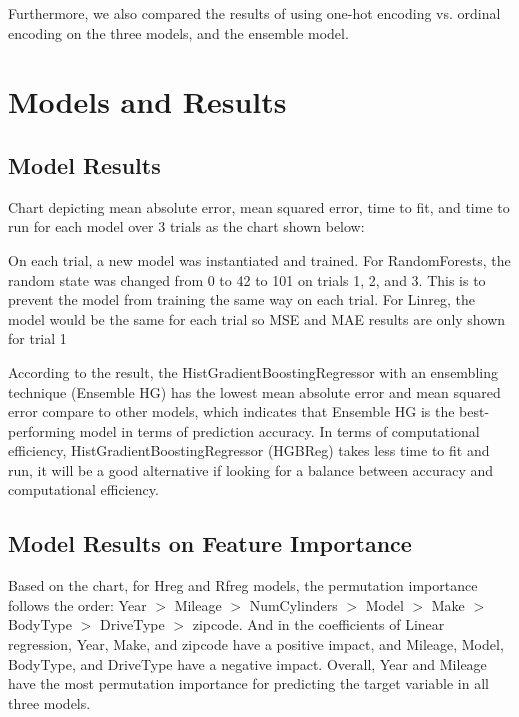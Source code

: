 \documentclass[UTF8]{ctexart}
\begin{document}
    Furthermore, we also compared the results of using one-hot encoding vs. ordinal encoding on the three models, and the ensemble model.
    \newline

    
    \section{Models and Results}
        \subsection{Model Results}
        Chart depicting mean absolute error, mean squared error, time to fit, and time to run for each model over 3 trials as the chart shown below:

        
        On each trial, a new model was instantiated and trained. For RandomForests, the random state was changed from 0 to 42 to 101 on trials 1, 2, and 3. This is to prevent the model from training the same way on each trial. For Linreg, the model would be the same for each trial so MSE and MAE results are only shown for trial 1
        
        According to the result, the HistGradientBoostingRegressor with an ensembling technique (Ensemble HG) has the lowest mean absolute error and mean squared error compare to other models, which indicates that Ensemble HG is the best-performing model in terms of prediction accuracy. In terms of computational efficiency, HistGradientBoostingRegressor (HGBReg) takes less time to fit and run, it will be a good alternative if looking for a balance between accuracy and computational efficiency.
        \newline
        \subsection{Model Results on Feature Importance}
    
         Based on the chart, for Hreg and Rfreg models, the permutation importance follows the order: Year $>$ Mileage $>$ NumCylinders $>$ Model $>$ Make $>$ BodyType $>$ DriveType $>$ zipcode. And in the coefficients of Linear regression, Year, Make, and zipcode have a positive impact, and Mileage, Model, BodyType, and DriveType have a negative impact. Overall, Year and Mileage have the most permutation importance for predicting the target variable in all three models. \newline
\end{document}
